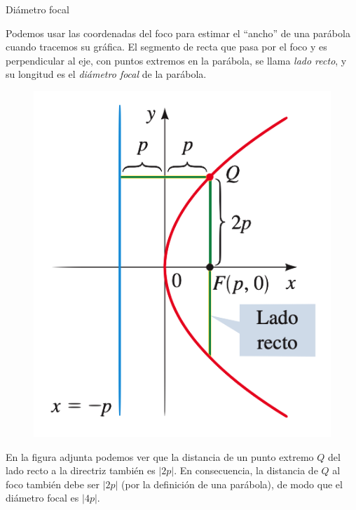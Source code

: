 \begin{myalertblock}{Diámetro focal}

Podemos usar las coordenadas del foco para estimar el ``ancho'' de una parábola cuando tracemos su gráfica. El segmento de recta que pasa por el foco y es perpendicular al eje, con puntos extremos en la parábola, se llama \emph{lado recto}, y su longitud es el \emph{diámetro focal} de la parábola.
	\begin{multicols}{2}
		\begin{figure}[H]
			\centering
			\includegraphics[width=.3\textwidth]{img-conicas/conicas39.png}
			\end{figure}
		
		En la  figura adjunta podemos ver que la distancia de un punto extremo $Q$ del lado recto a la directriz también es  $|2p|$. En consecuencia, la distancia de $Q$ al foco también debe ser $|2p|$ (por la definición de una parábola), de modo que el diámetro focal es $|4p|$. 
	\end{multicols}	
\end{myalertblock}

\vspace{5mm}

